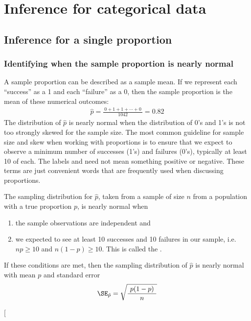 \chapter{Inference for categorical data}
\label{inferenceForCategoricalData}

\section{Inference for a single proportion}
\label{singleProportion}


\subsection{Identifying when the sample proportion is nearly normal}\label{tenpercent}

A sample proportion can be described as a sample mean. If we represent each ``success'' as a 1 and each ``failure'' as a 0, then the sample proportion is the mean of these numerical outcomes:
\begin{eqnarray*}
\hat{p} = \frac{\ 0 + 1 + 1 + \cdots + 0\ }{1042} = 0.82
\end{eqnarray*}
The distribution of $\hat{p}$ is nearly normal when the distribution of 0's and 1's is not too strongly skewed for the sample size. The most common guideline for sample size and skew when working with proportions is to ensure that we expect to observe a minimum number of successes (1's) and failures (0's), typically at least 10 of each. The labels  and  need not mean something positive or negative. These terms are just convenient words that are frequently used when discussing proportions.

\begin{termBox}{
The sampling distribution for $\hat{p}$, taken from a sample of size $n$ from a population with a true proportion $p$, is nearly normal when
\begin{enumerate}
\item the sample observations are independent and
\item we expected to see at least 10 successes and 10 failures in our sample, i.e. $np\geq10$ and $n(1-p)\geq10$. This is called the .
\end{enumerate}
If these conditions are met, then the sampling distribution of $\hat{p}$ is nearly normal with mean $p$ and standard error
\begin{eqnarray}
\SE_{\hat{p}} = \sqrt{\frac{\ p(1-p)\ }{n}}
\label{seOfPHat}
\end{eqnarray}}
\end{termBox}\marginpar[\raggedright\vspace{-53mm}


